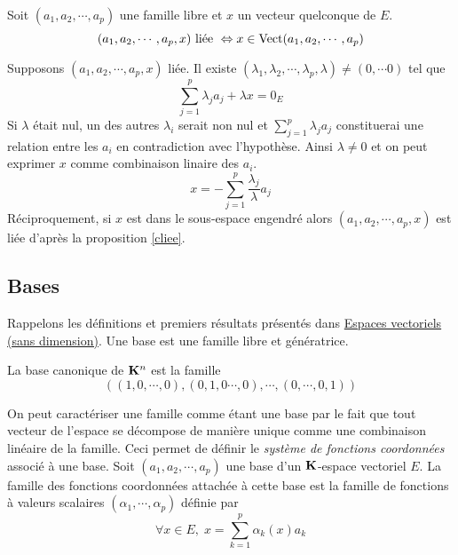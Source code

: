 \begin{propn}\label{lib+v}
 Soit $(a_1,a_2,\cdots,a_p)$ une famille libre et $x$ un vecteur quelconque de $E$.
\begin{displaymath}
(a_1,a_2,\cdots,a_p,x) \text{ liée } \Leftrightarrow x \in \mathop{\mathrm{Vect}}(a_1,a_2,\cdots,a_p)
\end{displaymath}
\end{propn}
\begin{demo}
Supposons $(a_1,a_2,\cdots,a_p,x)$ liée. Il existe $(\lambda_1,\lambda_2,\cdots,\lambda_p,\lambda)\neq(0,\cdots 0)$ tel que 
\begin{displaymath}
  \sum_{j=1}^p\lambda_j a_j + \lambda x = 0_E
\end{displaymath}
Si $\lambda$ était nul, un des autres $\lambda_i$ serait non nul et $\sum_{j=1}^p\lambda_j a_j$ constituerai une relation entre les $a_i$ en contradiction avec l'hypothèse. Ainsi $\lambda\neq 0$ et on peut exprimer $x$ comme combinaison linaire des $a_i$.
\begin{displaymath}
  x = - \sum_{j=1}^p\frac{\lambda_j}{\lambda} a_j
\end{displaymath}
Réciproquement, si $x$ est dans le sous-espace engendré alors $(a_1,a_2,\cdots,a_p,x)$ est liée d'après la proposition \ref{cliee}.
\end{demo}

\subsection{Bases}
Rappelons les définitions et premiers résultats présentés dans \href{\baseurl C2076.pdf}{Espaces vectoriels (sans dimension)}.\newline
Une base est une famille libre et génératrice.
\begin{exple}
  La base canonique de $\mathbf{K}^n$ est la famille
\begin{displaymath}
  \left( (1,0,\cdots,0), (0,1,0 \cdots ,0), \cdots, (0,\cdots , 0,1) \right) 
\end{displaymath}
\end{exple}
On peut caractériser une famille comme étant une base par le fait que tout vecteur de l'espace se décompose de manière unique comme une combinaison linéaire de la famille. Ceci permet de définir le \emph{système de fonctions coordonn\'ees} associé à une base.\newline
Soit $(a_1,a_2,\cdots, a_p)$ une base d'un $\mathbf{K}$-espace vectoriel $E$.  La famille des fonctions coordonnées attachée à cette base est la famille de fonctions à valeurs scalaires $(\alpha_1,\cdots,\alpha_p)$ définie par 
\begin{displaymath}
  \forall x \in E, \; x = \sum_{k=1}^p \alpha_k(x) a_k
\end{displaymath}

